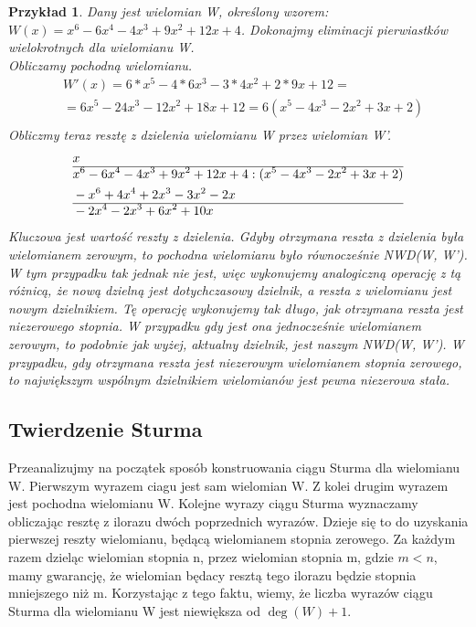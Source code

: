 \documentclass[twoside,a4paper]{book}
\newtheorem{example}{Przykład}
\begin{document}
\begin{example}
	Dany jest wielomian W, określony wzorem: $W(x)=x^6-6x^4-4x^3+9x^2+12x+4$. Dokonajmy eliminacji pierwiastków wielokrotnych dla wielomianu W. \\
	Obliczamy pochodną wielomianu.
	\begin{equation}
	\begin{split}
	&W'(x)=6*x^5-4*6x^3-3*4x^2+2*9x+12=\\
	&=6x^5-24x^3-12x^2+18x+12=6(x^5-4x^3-2x^2+3x+2)\\
	\end{split}
	\end{equation}
	Obliczmy teraz resztę z dzielenia wielomianu W przez wielomian W'.
	\begin{equation}
	\begin{split}
	&x\\\hline
	&x^6-6x^4-4x^3+9x^2+12x+4 : (x^5-4x^3-2x^2+3x+2) \\
	&-x^6+4x^4+2x^3-3x^2-2x \\\hline
	&-2x^4-2x^3+6x^2+10x \\
	\end{split}
	\end{equation}
	Kluczowa jest wartość reszty z dzielenia. Gdyby otrzymana reszta z dzielenia była wielomianem zerowym, to pochodna wielomianu było równocześnie NWD(W, W'). W tym przypadku tak jednak nie jest, więc wykonujemy analogiczną operację z tą różnicą, że nową dzielną jest dotychczasowy dzielnik, a reszta z wielomianu jest nowym dzielnikiem. Tę operację wykonujemy tak długo, jak otrzymana reszta jest niezerowego stopnia. W przypadku gdy jest ona jednocześnie wielomianem zerowym, to podobnie jak wyżej, aktualny dzielnik, jest naszym NWD(W, W'). W przypadku, gdy otrzymana reszta jest niezerowym wielomianem stopnia zerowego, to największym wspólnym dzielnikiem wielomianów jest pewna niezerowa stała.
\end{example}

\subsection{Twierdzenie Sturma}

Przeanalizujmy na początek sposób konstruowania ciągu Sturma dla wielomianu W. Pierwszym wyrazem ciagu jest sam wielomian W. Z kolei drugim wyrazem jest pochodna wielomianu W. Kolejne wyrazy ciągu Sturma wyznaczamy obliczając resztę z ilorazu dwóch poprzednich wyrazów. Dzieje się to do uzyskania pierwszej reszty wielomianu, będącą wielomianem stopnia zerowego. Za każdym razem dzieląc wielomian stopnia n, przez wielomian stopnia m, gdzie $m<n$, mamy gwarancję, że wielomian będacy resztą tego ilorazu będzie stopnia mniejszego niż m. Korzystając z tego faktu, wiemy, że liczba wyrazów ciągu Sturma dla wielomianu W jest niewiększa od $\deg(W)+1$.
\end{document}
